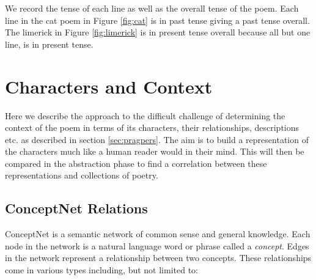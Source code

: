 We record the tense of each line as well as the overall tense of the poem. Each line in the cat poem in Figure \ref{fig:cat} is in past tense giving a past tense overall. The limerick in Figure \ref{fig:limerick} is in present tense overall because all but one line, is in present tense. 


\section{Characters and Context}
Here we describe the approach to the difficult challenge of determining the context of the poem in terms of its characters, their relationships, descriptions etc. as described in section \ref{sec:pragpers}. The aim is to build a representation of the characters much like a human reader would in their mind. This will then be compared in the abstraction phase to find a correlation between these representations and collections of poetry.

\subsection{ConceptNet Relations}
ConceptNet is a semantic network of common sense and general knowledge. Each node in the network is a natural language word or phrase called a \textit{concept}. Edges in the network represent a relationship between two concepts. These relationships come in various types including, but not limited to:

